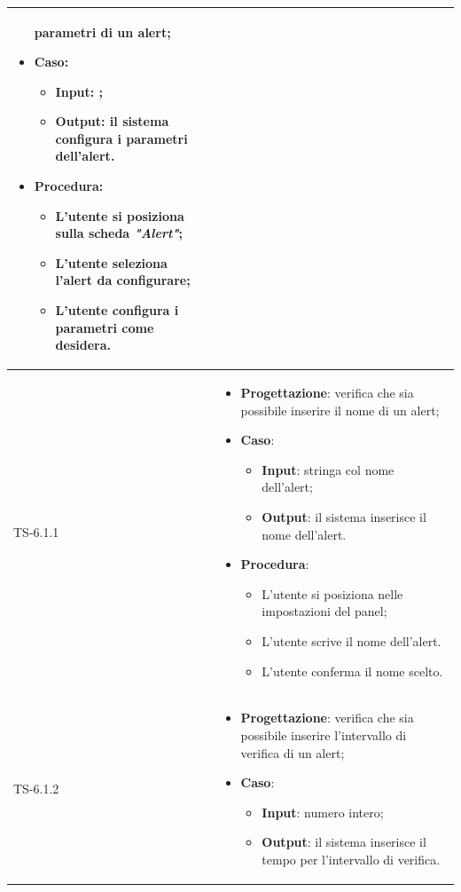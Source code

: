 \begin{longtable}{|C{2.5cm}|C{13cm}|}
\begin{itemize}
	parametri di un alert;
	\item \textbf{Caso}: 
	\begin{itemize}
		\item \textbf{Input}: ;
		\item \textbf{Output}: il sistema configura i parametri dell'alert.
	\end{itemize}
	\item \textbf{Procedura}:
	\begin{itemize}
		\item L'utente si posiziona sulla scheda \emph{"Alert"};
		\item L'utente seleziona l'alert da configurare;
		\item L'utente configura i parametri come desidera.
	\end{itemize} 
\end{itemize}
	 \\
	\hline
	{TS-6.1.1} &
\begin{itemize}
	\item \textbf{Progettazione}: verifica che sia possibile inserire il nome
	di un alert;
	\item \textbf{Caso}: 
	\begin{itemize}
		\item \textbf{Input}: stringa col nome dell'alert;
		\item \textbf{Output}: il sistema inserisce il nome dell'alert.
	\end{itemize}
	\item \textbf{Procedura}:
	\begin{itemize}
		\item L'utente si posiziona nelle impostazioni del panel;
		\item L'utente scrive il nome dell'alert.
		\item L'utente conferma il nome scelto.
	\end{itemize} 
\end{itemize}
	  \\
	\hline
	{TS-6.1.2} & 
\begin{itemize}
	\item \textbf{Progettazione}: verifica che sia  possibile inserire
	l'intervallo di verifica di un alert;
	\item \textbf{Caso}: 
	\begin{itemize}
		\item \textbf{Input}: numero intero;
		\item \textbf{Output}: il sistema inserisce il tempo per l'intervallo di verifica.

\end{itemize}
\end{itemize}
\end{longtable}
